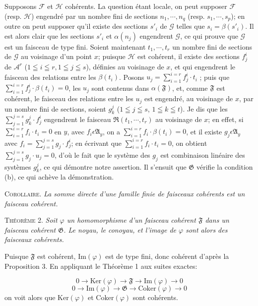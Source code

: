 Supposons $\mathcal{F}$ et $\mathcal{H}$ cohérents. La question étant locale, on peut supposer $\mathcal{F}$ (resp. $\mathcal{H}$) engendré par un nombre fini de sections $n_1 , \cdots , n_q$ (resp. $s_1 , \cdots , s_p$); en outre on peut supposer qu'il existe des sections $s'_i$ de $\mathcal{G}$ telles que $s_i = \beta(s'_i)$. Il est alors clair que les sections $s'_i$ et $\alpha(n_j)$ engendrent $\mathcal{G}$, ce qui prouve que $\mathcal{G}$ est un faisceau de type fini. Soient maintenant $t_1 , \cdots , t_r$ un nombre fini de sections de $\mathcal{G}$ au voisinage d'un point $x$; puisque $\mathcal{H}$ est cohérent, il existe des sections $f^i_j$ de $\mathcal{A}^r$ ($1 \leqq i \leqq r, 1 \leqq j \leqq s$), définies au voisinage de $x$, et qui engendrent le faisceau des relations entre les $\beta(t_i)$. Posons $u_j = \sum_{i=1}^{i=r} f^i_j \cdot t_i$ ; puis
que $\sum_{i=1}^{i=r} f_j^i \cdot \beta(t_i) = 0$, les $u_j$ sont contenus dans $\alpha(\mathfrak{F})$, et, comme $\mathfrak{F}$ est cohérent, le faisceau des relations entre les $u_j$ est engendré, au voisinage de $x$, par un nombre fini de sections, soient $g_k^j$ ($1 \leqq j \leqq s$, $1 \leqq k \leqq t$). Je dis que les $\sum_{j=1}^{j=s} g_k^j \cdot f_j^i$ engendrent le faisceau $\mathfrak{R}(t_1, \cdots, t_r)$ au voisinage de $x$; en effet, si $\sum_{i=1}^{i=r} f_i \cdot t_i = 0$ en $y$, avec $f_i \epsilon \mathfrak{A}_y$, on a $\sum_{i=1}^{i=r} f_i \cdot \beta(t_i) = 0$, et il existe $g_j \epsilon \mathfrak{A}_y$ avec $f_i = \sum_{j=1}^{j=s} g_j \cdot f_j^i$; en écrivant que $\sum_{i=1}^{i=r} f_i \cdot t_i = 0$, on obtient $\sum_{j=1}^{j=s} g_j \cdot u_j = 0$, d'où le fait que le système des $g_j$ est combinaison linéaire des systèmes $g_k^j$, ce qui démontre notre assertion. Il s'ensuit que $\mathfrak{G}$ vérifie la condition (b), ce qui achève la démonstration.

\textsc{Corollaire}. \emph{La somme directe d'une famille finie de faisceaux cohérents est un faisceau cohérent.}

\textsc{Théorème} 2. \emph{Soit $\varphi$ un homomorphisme d'un faisceau cohérent $\mathfrak{F}$ dans un faisceau cohérent $\mathfrak{G}$. Le noyau, le conoyau, et l'image de $\varphi$ sont alors des faisceaux cohérents.}

Puisque $\mathfrak{F}$ est cohérent, $\mathrm{Im}(\varphi)$ est de type fini, donc cohérent d'après la Proposition 3. En appliquant le Théorème 1 aux suites exactes:

\begin{equation*}
0 \to \mathrm{Ker}(\varphi) \to \mathfrak{F} \to \mathrm{Im}(\varphi) \to 0
\end{equation*}
\begin{equation*}
0 \to \mathrm{Im}(\varphi) \to \mathfrak{G} \to \mathrm{Coker}(\varphi) \to 0
\end{equation*}
on voit alors que $\mathrm{Ker}(\varphi)$ et $\mathrm{Coker}(\varphi)$ sont cohérents.

